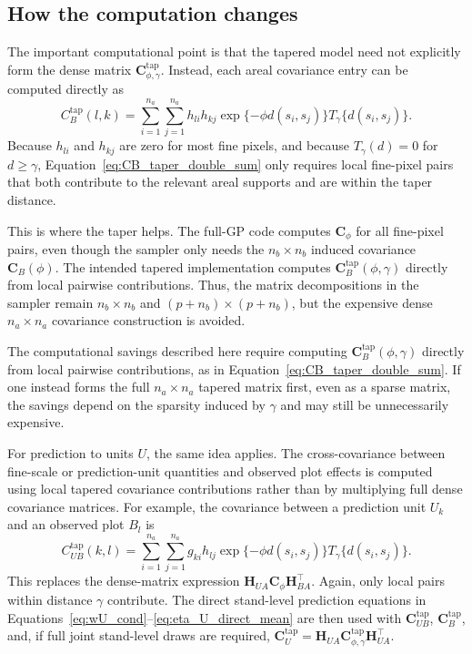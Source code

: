 \documentclass[11pt]{article}
\begin{document}
\subsection{How the computation changes}

The important computational point is that the tapered model need not explicitly form the dense matrix $\bm{C}^{\mathrm{tap}}_{\phi,\gamma}$. Instead, each areal covariance entry can be computed directly as
\begin{equation}
C^{\mathrm{tap}}_B(l,k)
=
\sum_{i=1}^{n_a}
\sum_{j=1}^{n_a}
h_{li}h_{kj}
\exp\{-\phi d(s_i,s_j)\}
T_{\gamma}\{d(s_i,s_j)\}.
\label{eq:CB_taper_double_sum}
\end{equation}
Because $h_{li}$ and $h_{kj}$ are zero for most fine pixels, and because $T_{\gamma}(d)=0$ for $d\ge\gamma$, Equation~\eqref{eq:CB_taper_double_sum} only requires local fine-pixel pairs that both contribute to the relevant areal supports and are within the taper distance.

This is where the taper helps. The full-GP code computes $\bm{C}_{\phi}$ for all fine-pixel pairs, even though the sampler only needs the $n_b\times n_b$ induced covariance $\bm{C}_B(\phi)$. The intended tapered implementation computes $\bm{C}^{\mathrm{tap}}_B(\phi,\gamma)$ directly from local pairwise contributions. Thus, the matrix decompositions in the sampler remain $n_b\times n_b$ and $(p+n_b)\times(p+n_b)$, but the expensive dense $n_a\times n_a$ covariance construction is avoided.

The computational savings described here require computing $\bm{C}^{\mathrm{tap}}_B(\phi,\gamma)$ directly from local pairwise contributions, as in Equation~\eqref{eq:CB_taper_double_sum}. If one instead forms the full $n_a\times n_a$ tapered matrix first, even as a sparse matrix, the savings depend on the sparsity induced by $\gamma$ and may still be unnecessarily expensive.

For prediction to units $U$, the same idea applies. The cross-covariance between fine-scale or prediction-unit quantities and observed plot effects is computed using local tapered covariance contributions rather than by multiplying full dense covariance matrices. For example, the covariance between a prediction unit $U_k$ and an observed plot $B_l$ is
\begin{equation}
C^{\mathrm{tap}}_{UB}(k,l)
=
\sum_{i=1}^{n_a}
\sum_{j=1}^{n_a}
g_{ki}h_{lj}
\exp\{-\phi d(s_i,s_j)\}
T_{\gamma}\{d(s_i,s_j)\}.
\label{eq:CUB_taper}
\end{equation}
This replaces the dense-matrix expression $\bm{H}_{UA}\bm{C}_{\phi}\bm{H}_{BA}^{\top}$. Again, only local pairs within distance $\gamma$ contribute. The direct stand-level prediction equations in Equations~\eqref{eq:wU_cond}--\eqref{eq:eta_U_direct_mean} are then used with $\bm{C}_{UB}^{\mathrm{tap}}$, $\bm{C}_{B}^{\mathrm{tap}}$, and, if full joint stand-level draws are required, $\bm{C}_{U}^{\mathrm{tap}}=\bm{H}_{UA}\bm{C}^{\mathrm{tap}}_{\phi,\gamma}\bm{H}_{UA}^{\top}$.
\end{document}
